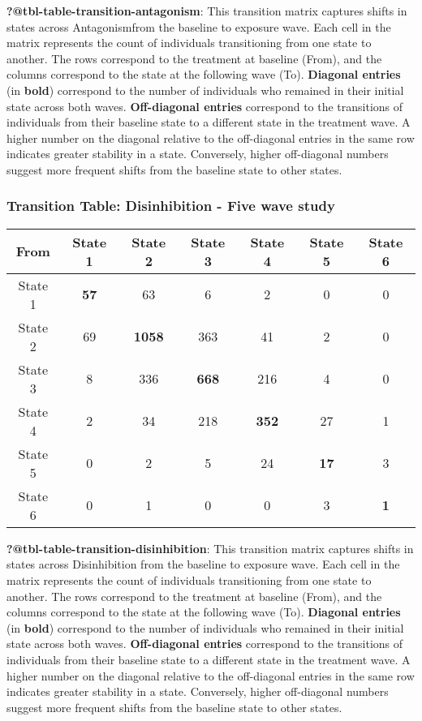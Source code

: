 \documentclass[
  singlecolumn]{article}
\begin{document}
\textbf{?@tbl-table-transition-antagonism}: This transition matrix
captures shifts in states across Antagonismfrom the baseline to exposure
wave. Each cell in the matrix represents the count of individuals
transitioning from one state to another. The rows correspond to the
treatment at baseline (From), and the columns correspond to the state at
the following wave (To). \textbf{Diagonal entries} (in \textbf{bold})
correspond to the number of individuals who remained in their initial
state across both waves. \textbf{Off-diagonal entries} correspond to the
transitions of individuals from their baseline state to a different
state in the treatment wave. A higher number on the diagonal relative to
the off-diagonal entries in the same row indicates greater stability in
a state. Conversely, higher off-diagonal numbers suggest more frequent
shifts from the baseline state to other states.

\subsubsection{Transition Table: Disinhibition - Five wave
study}\label{transition-table-disinhibition---five-wave-study}

\begin{longtable}[]{@{}ccccccc@{}}
\toprule\noalign{}
From & State 1 & State 2 & State 3 & State 4 & State 5 & State 6 \\
\midrule\noalign{}
\endhead
\bottomrule\noalign{}
\endlastfoot
State 1 & \textbf{57} & 63 & 6 & 2 & 0 & 0 \\
State 2 & 69 & \textbf{1058} & 363 & 41 & 2 & 0 \\
State 3 & 8 & 336 & \textbf{668} & 216 & 4 & 0 \\
State 4 & 2 & 34 & 218 & \textbf{352} & 27 & 1 \\
State 5 & 0 & 2 & 5 & 24 & \textbf{17} & 3 \\
State 6 & 0 & 1 & 0 & 0 & 3 & \textbf{1} \\
\end{longtable}

\textbf{?@tbl-table-transition-disinhibition}: This transition matrix
captures shifts in states across Disinhibition from the baseline to
exposure wave. Each cell in the matrix represents the count of
individuals transitioning from one state to another. The rows correspond
to the treatment at baseline (From), and the columns correspond to the
state at the following wave (To). \textbf{Diagonal entries} (in
\textbf{bold}) correspond to the number of individuals who remained in
their initial state across both waves. \textbf{Off-diagonal entries}
correspond to the transitions of individuals from their baseline state
to a different state in the treatment wave. A higher number on the
diagonal relative to the off-diagonal entries in the same row indicates
greater stability in a state. Conversely, higher off-diagonal numbers
suggest more frequent shifts from the baseline state to other states.
\end{document}

